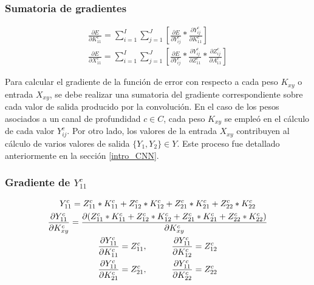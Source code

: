 \subsubsection{Sumatoria de gradientes}

\begin{gather}
	\frac{\partial E}{\partial K^c_{11}} = \sum_{i=1}^{I}\sum_{j=1}^{J}  [\frac{\partial E}{\partial Y^c_{ij}} * \frac{\partial Y^c_{ij}}{\partial K^c_{11}}] \\
	\frac{\partial E}{\partial X^c_{11}} = \sum_{i=1}^{I}\sum_{j=1}^{J}  [\frac{\partial E}{\partial Y^c_{ij}} * \frac{\partial Y^c_{ij}}{\partial Z^c_{11}} * \frac{\partial Z^c_{ij}}{\partial A^c_{11}}] 
\end{gather}

Para calcular el gradiente de la función de error con respecto a cada peso ${K_{xy}}$ o entrada ${X_{xy}}$, se debe realizar una sumatoria del gradiente correspondiente sobre cada valor de salida producido por la convolución. En el caso de los pesos asociados a un canal de profundidad $c \in C$, cada peso ${K_{xy}}$ se empleó en el cálculo de cada valor $Y^c_{ij}$. Por otro lado, los valores de la entrada ${X_{xy}}$ contribuyen al cálculo de varios valores de salida $\{Y_1, Y_2\} \in Y$. Este proceso fue detallado anteriormente en la sección \ref{intro_CNN}.

\subsubsection{Gradiente de $Y^c_{11}$}

\begin{gather}
	Y^c_{11} = Z^c_{11} * K^c_{11} + Z^c_{12} * K^c_{12} + Z^c_{21} * K^c_{21} + Z^c_{22} * K^c_{22} \label{grad_y11_k_11} \\
	\frac{\partial Y^c_{11}}{\partial K^c_{xy}} = \frac{\partial (Z^c_{11} * K^c_{11} + Z^c_{12} * K^c_{12} + Z^c_{21} * K^c_{21} + Z^c_{22} * K^c_{22})}{\partial K^c_{xy}} \label{grad_y11_k_12} \\
	\frac{\partial Y^c_{11}}{\partial K^c_{11}} = Z^c_{11}, \hspace{10mm} \frac{\partial Y^c_{11}}{\partial K^c_{12}} = Z^c_{12} \label{grad_y11_k_21}\\
	\frac{\partial Y^c_{11}}{\partial K^c_{21}} = Z^c_{21}, \hspace{10mm} \frac{\partial Y^c_{11}}{\partial K^c_{22}} = Z^c_{22} \label{grad_y11_k_22}
\end{gather}

